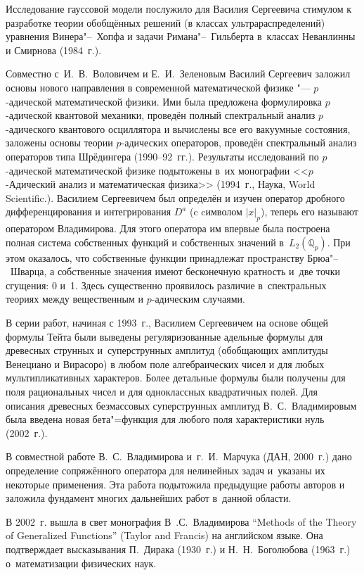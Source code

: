 Исследование гауссовой модели послужило для Василия Сергеевича стимулом к разработке теории обобщённых решений (в классах ультрараспределений) уравнения Винера"--~Хопфа и задачи Римана"--~Гильберта в~классах Неванлинны и Смирнова (1984~г.).


Совместно с~И.~В.~Воловичем и Е.~И.~Зеленовым Василий Сергеевич заложил основы нового направления в современной математической физике "--- $p$-адической математической физики. 
Ими была предложена формулировка $p$-адической квантовой механики, проведён полный спектральный анализ $p$-адического квантового осциллятора и вычислены все его вакуумные состояния, заложены основы теории $p$-адических операторов, проведён спектральный анализ операторов типа Шрёдингера (1990--92~гг.). Результаты исследований по $p$-адической математической физике подытожены в~их монографии <<$p$-Адический анализ и математическая физика>> (1994~г., Наука, World Scientific.).
Василием Сергеевичем был определён и изучен оператор дробного дифференцирования и интегрирования $D^a$ (c cимволом $|x|_p$), теперь его называют оператором Владимирова. 
Для этого оператора им впервые была построена полная система собственных функций и собственных значений в~$L_2 (\mathbb Q_p )$. При этом оказалось, что собственные функции принадлежат пространству Брюа"--~Шварца, а собственные значения имеют бесконечную кратность и~две точки сгущения: 0 и~1. Здесь существенно проявилось различие в~спектральных теориях между вещественным и $p$-адическим случаями.

В серии работ, начиная с 1993~г., Василием Сергеевичем на основе общей формулы Тейта были выведены регуляризованные адельные формулы для древесных струнных и~суперструнных амплитуд (обобщающих амплитуды Венециано и Вирасоро) в любом поле алгебраических чисел и для любых мультипликативных характеров. 
Более детальные формулы были получены для поля рациональных чисел и для одноклассных квадратичных полей. Для описания древесных безмассовых суперструнных амплитуд В.~С.~Владимировым была введена новая бета"=функция для любого поля характеристики нуль (2002~г.).


В совместной работе В.~С.~Владимирова и~г.~И.~Марчука (ДАН, 2000~г.) дано определение сопряжённого оператора для нелинейных задач и~указаны их некоторые применения. 
Эта работа подытожила предыдущие работы авторов и заложила фундамент многих дальнейших работ в~данной области.


В 2002~г. вышла в свет монография В~.С.~Владимирова ``Methods of the Theory of Generalized Functions'' (Taylor and Francis) на английском языке. Она подтверждает высказывания П.~Дирака (1930~г.) и Н.~Н.~Боголюбова (1963~г.) о~математизации физических наук.

